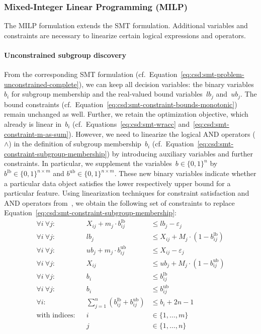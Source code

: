 \documentclass{article}
\theoremstyle{definition}
\begin{document}
\subsubsection{Mixed-Integer Linear Programming (MILP)}
\label{sec:csd:appendix:further-encodings:milp}

The MILP formulation extends the SMT formulation.
Additional variables and constraints are necessary to linearize certain logical expressions and operators.

\paragraph{Unconstrained subgroup discovery}

From the corresponding SMT formulation (cf.~Equation~\ref{eq:csd:smt-problem-unconstrained-complete}), we can keep all decision variables:
the binary variables~$b_i$ for subgroup membership and the real-valued bound variables~$\mathit{lb}_j$ and~$\mathit{ub}_j$.
The bound constraints (cf.~Equation~\ref{eq:csd:smt-constraint-bounds-monotonic}) remain unchanged as well.
Further, we retain the optimization objective, which already is linear in~$b_i$ (cf.~Equations~\ref{eq:csd:smt-wracc} and~\ref{eq:csd:smt-constraint-m-as-sum}).
However, we need to linearize the logical AND operators ($\land$) in the definition of subgroup membership~$b_i$ (cf.~Equation~\ref{eq:csd:smt-constraint-subgroup-membership}) by introducing auxiliary variables and further constraints.
In particular, we supplement the variables~$b \in \{0, 1\}^n$ by $b^{\text{lb}} \in \{0, 1\}^{n \times m}$ and $b^{\text{ub}} \in \{0, 1\}^{n \times m}$.
These new binary variables indicate whether a particular data object satisfies the lower respectively upper bound for a particular feature.
Using linearization techniques for constraint satisfaction and AND operators from~\cite{mosek2022modeling}, we obtain the following set of constraints to replace Equation~\ref{eq:csd:smt-constraint-subgroup-membership}:
%
\begin{equation}
	\begin{aligned}
		\forall i~\forall j: & & X_{ij} + m_j \cdot b^{\text{lb}}_{ij} &\leq \mathit{lb}_j - \varepsilon_j \\
	 	\forall i~\forall j: & & \mathit{lb}_j &\leq X_{ij} + M_j \cdot \left(1 - b^{\text{lb}}_{ij} \right) \\
	 	\forall i~\forall j: & & \mathit{ub}_j + m_j \cdot b^{\text{ub}}_{ij} &\leq X_{ij} - \varepsilon_j \\
	 	\forall i~\forall j: & & X_{ij} &\leq \mathit{ub}_j + M_j \cdot \left(1 - b^{\text{ub}}_{ij} \right) \\
	 	\forall i~\forall j: & & b_i &\leq b^{\text{lb}}_{ij} \\
	 	\forall i~\forall j: & & b_i &\leq b^{\text{ub}}_{ij} \\
	 	\forall i: & & \sum_{j=1}^{n} \left( b^{\text{lb}}_{ij} + b^{\text{ub}}_{ij} \right) &\leq b_i + 2n - 1 \\
		\text{with indices:} & & i &\in \{1, \dots, m\} \\
		& & j &\in \{1, \dots, n\}
	\end{aligned}
	\label{eq:csd:milp-constraint-subgroup-membership}
\end{equation}
\end{document}
